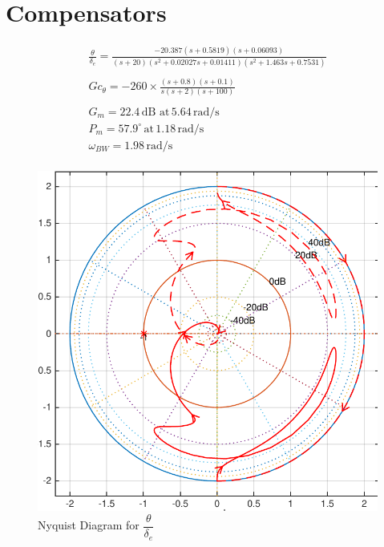 \documentclass[11pt]{article}
\begin{document}
\clearpage
\section{Compensators}

\begin{gather*}
\frac{\theta}{\delta_e}=\frac{-20.387 (s+0.5819) (s+0.06093)}{(s+20) (s^2 + 0.02027s + 0.01411) (s^2 + 1.463s + 0.7531)} \\
\\
\boxed{Gc_{\theta} = -260 \times \frac{(s+0.8)(s+0.1)}{s(s+2)(s+100)}} \\
\\
G_m=22.4\,\mathrm{dB\,\, at\,} 5.64 \,\mathrm{rad/s}  \\
P_m=57.9^{\circ}\, \mathrm{at}\, 1.18 \,\mathrm{rad/s} \\
\omega_{BW}=1.98\, \mathrm{rad/s}\\
\end{gather*}

\begin{figure}[h!]
\begin{center}
\includegraphics[height=.4\textheight]{figures/nyquist_theta}
\caption{Nyquist Diagram for $\dfrac{\theta}{\delta_e}$}
\end{center}
\end{figure}
\end{document}
